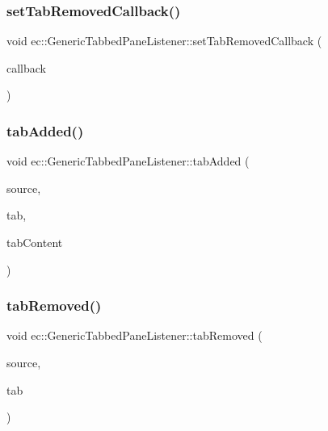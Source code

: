 \subsubsection{\texorpdfstring{set\+Tab\+Removed\+Callback()}{setTabRemovedCallback()}}
{\footnotesize\ttfamily void ec\+::\+Generic\+Tabbed\+Pane\+Listener\+::set\+Tab\+Removed\+Callback (\begin{DoxyParamCaption}\item[{const \mbox{\hyperlink{classec_1_1_generic_tabbed_pane_listener_a806d9a110845a5bdcb4b10e7fb57beca}{Tab\+Removed\+\_\+\+Callback}} \&}]{callback }\end{DoxyParamCaption})}

\mbox{\label{classec_1_1_generic_tabbed_pane_listener_aa00e18c320111a63c11eb9500574585d}} 
\subsubsection{\texorpdfstring{tab\+Added()}{tabAdded()}}
{\footnotesize\ttfamily void ec\+::\+Generic\+Tabbed\+Pane\+Listener\+::tab\+Added (\begin{DoxyParamCaption}\item[{agui\+::\+Tabbed\+Pane $\ast$}]{source,  }\item[{agui\+::\+Tab $\ast$}]{tab,  }\item[{agui\+::\+Widget $\ast$}]{tab\+Content }\end{DoxyParamCaption})\hspace{0.3cm}{\ttfamily [override]}}

\mbox{\label{classec_1_1_generic_tabbed_pane_listener_a8489d4a6e19fe55d24919ebf78e83d54}} 
\subsubsection{\texorpdfstring{tab\+Removed()}{tabRemoved()}}
{\footnotesize\ttfamily void ec\+::\+Generic\+Tabbed\+Pane\+Listener\+::tab\+Removed (\begin{DoxyParamCaption}\item[{agui\+::\+Tabbed\+Pane $\ast$}]{source,  }\item[{agui\+::\+Tab $\ast$}]{tab }\end{DoxyParamCaption})\hspace{0.3cm}{\ttfamily [override]}}



